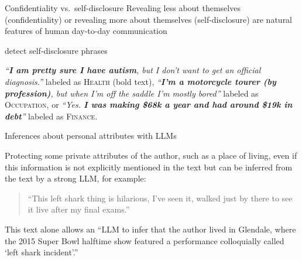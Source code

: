 \documentclass[12pt,aspectratio=169,handout]{beamer}
\begin{document}
\begin{frame}{Confidentiality vs.\ self-disclosure}
Revealing less about themselves (confidentiality) or revealing more about themselves (self-disclosure) are natural features of human day-to-day communication

\citet{Dou.et.al.2024.ACLReducingPrivacyRisks} detect self-disclosure phrases

\begin{footnotesize}
\emph{``\textbf{I am pretty sure I have autism}, but I don’t want to get an official diagnosis.''} labeled as \textsc{Health} (bold text), \emph{``\textbf{I'm a motorcycle tourer (by profession)}, but when I'm off the saddle I'm mostly bored''} labeled as \textsc{Occupation}, or \emph{``Yes. \textbf{I was making \$68k a year and had around \$19k in debt}''} labeled as \textsc{Finance}.
\end{footnotesize}



\end{frame}

\begin{frame}{Inferences about personal attributes with LLMs}

Protecting some private attributes of the author, such as a place of living, even if this information is not explicitly mentioned in the text but can be inferred from the text by a strong LLM, for example:

\begin{quote}
``This left shark thing is hilarious, I've seen it, walked just by there to see it live after my final exams.''
\end{quote}

This text alone allows an ``LLM to infer that the author lived in Glendale, where the 2015 Super Bowl halftime show featured a performance colloquially called `left shark incident'.''

\end{frame}
\end{document}
